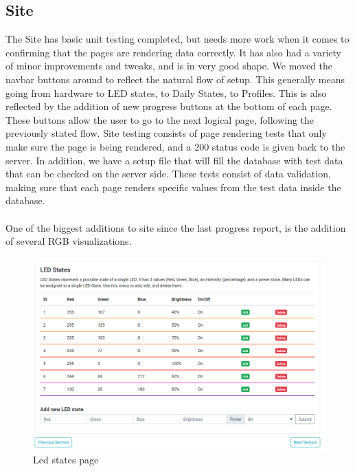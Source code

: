 \documentclass[onecolumn, draftclsnofoot,10pt, compsoc]{IEEEtran}
\begin{document}
	\subsection{Site}
		\noindent The Site has basic unit testing completed, but needs more work when it comes to confirming that the pages are rendering data correctly.
		It has also had a variety of minor improvements and tweaks, and is in very good shape. We moved the navbar buttons around to reflect the natural
		flow of setup. This generally means going from hardware to LED states, to Daily States, to Profiles. This is also reflected by the addition of new
		progress buttons at the bottom of each page. These buttons allow the user to go to the next logical page, following the previously stated flow.
		Site testing consists of page rendering tests that only make sure the page is being rendered, and a 200 status code is given back to the server.
		In addition, we have a setup file that will fill the database with test data that can be checked on the server side. These tests consist of data
		validation, making sure that each page renders specific values from the test data inside the database.
	  \\\\
		\noindent One of the biggest additions to site since the last progress report, is the addition of several RGB visualizations.
		\begin{center}
			\begin{figure}[H]
				\includegraphics[width=\linewidth]{site/led_states.png}
				\caption{Led states page}
				\label{fig:siteLEDStates}
			\end{figure}
		\end{center}
\end{document}
